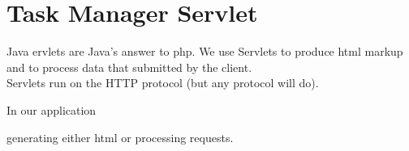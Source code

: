 \chapter{Task Manager Servlet}
\minitoc

Java ervlets are Java's answer to php. We use Servlets to produce html markup and to process data that submitted by the client.\\ 

Servlets run on the HTTP protocol (but any protocol will do).  


In our application 

generating either html or processing requests.  
 